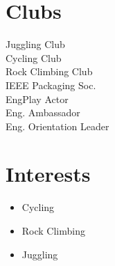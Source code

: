 \documentclass[]{chandan-cv}
\begin{document}
\hfill
\begin{minipage}[t]{0.20\textwidth}

\section{Clubs}
Juggling Club \\
Cycling Club \\
Rock Climbing Club \\
IEEE Packaging Soc. \\
EngPlay Actor \\
Eng. Ambassador \\
Eng. Orientation Leader

\section{Interests}
\begin{itemize}
	\setlength\itemsep{-0.3em}
    \item Cycling
	\item Rock Climbing
	\item Juggling
\end{itemize}
\end{minipage}

%
%
\end{document}
